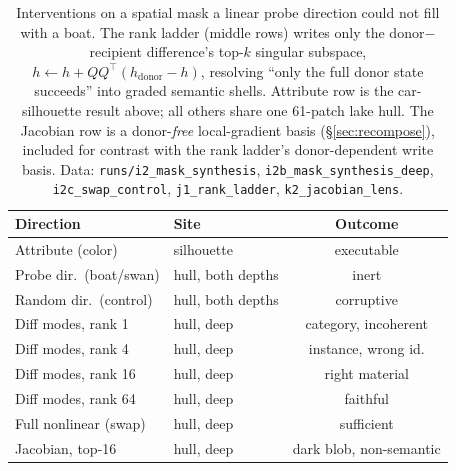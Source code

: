 \documentclass[10pt,twocolumn,letterpaper]{article}
\begin{document}
\begin{table}[t]
\centering
\footnotesize
\setlength{\tabcolsep}{3.5pt}
\begin{tabular}{@{}llc@{}}
\toprule
Direction & Site & Outcome \\
\midrule
Attribute (color) & silhouette & executable \\
Probe dir.\ (boat/swan) & hull, both depths & inert \\
Random dir.\ (control) & hull, both depths & corruptive \\
Diff modes, rank 1 & hull, deep & category, incoherent \\
Diff modes, rank 4 & hull, deep & instance, wrong id. \\
Diff modes, rank 16 & hull, deep & right material \\
Diff modes, rank 64 & hull, deep & faithful \\
Full nonlinear (swap) & hull, deep & sufficient \\
Jacobian, top-16 & hull, deep & dark blob, non-semantic \\
\bottomrule
\end{tabular}
\caption{Interventions on a spatial mask a linear probe direction
could not fill with a boat. The rank ladder (middle rows) writes only
the donor$-$recipient difference's top-$k$ singular subspace,
$h \leftarrow h + QQ^{\top}(h_{\text{donor}}-h)$, resolving ``only the
full donor state succeeds'' into graded semantic shells. Attribute row
is the car-silhouette result above; all others share one 61-patch lake
hull. The Jacobian row is a donor-\emph{free} local-gradient basis
(\S\ref{sec:recompose}), included for contrast with the rank ladder's
donor-dependent write basis. Data: \texttt{runs/i2\_mask\_synthesis},
\texttt{i2b\_mask\_synthesis\_deep}, \texttt{i2c\_swap\_control},
\texttt{j1\_rank\_ladder}, \texttt{k2\_jacobian\_lens}.}
\label{tab:taxonomy}
\end{table}
\end{document}

